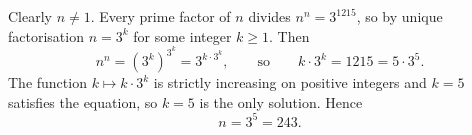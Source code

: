 Clearly $n\ne1$. Every prime factor of $n$ divides $n^n=3^{1215}$, so by unique factorisation $n=3^k$ for some integer $k\ge1$. Then
\[n^n=\left(3^k\right)^{3^k}=3^{k\cdot3^k},\qquad\text{so}\qquad k\cdot3^k=1215=5\cdot3^5.\]
The function $k\mapsto k\cdot3^k$ is strictly increasing on positive integers and $k=5$ satisfies the equation, so $k=5$ is the only solution. Hence
\[n=3^5=\boxed{243}.\]

